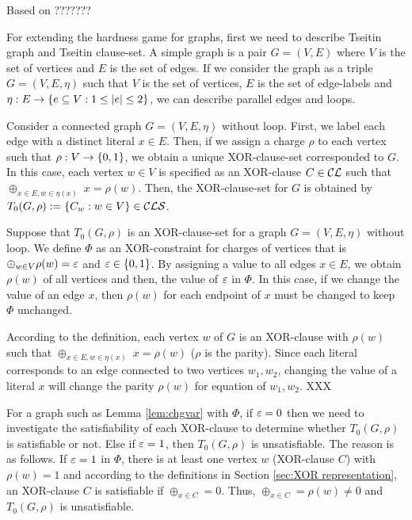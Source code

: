\documentclass{report}
\begin{document}
Based on \cite{h34,h8} ???????

For extending the hardness game for graphs, first we need to describe Tseitin graph and Tseitin clause-set. A simple graph is a pair $G = (V,E)$ where $V$ is the set of vertices and $E$ is the set of edges. If we consider the graph as a triple $G = (V,E,\eta)$ such that $V$ is the set of vertices, $E$ is the set of edge-labels and $\eta: E \rightarrow \{ e \subseteq V : 1 \le \lvert e \rvert \le 2 \}$, we can describe parallel edges and loops. 

Consider a connected graph $G=(V,E,\eta)$ without loop. First, we label each edge with a distinct literal $x \in E$. Then, if we assign a charge $\rho$ to each vertex such that $\rho: V \rightarrow \{ 0,1 \}$, we obtain a unique XOR-clause-set corresponded to $G$. In this case, each vertex $w \in V$ is specified as an XOR-clause $C \in \mathcal{CL}$ such that $\oplus_{x \in E, w \in \eta(x)} \; x = \rho(w)$. Then, the XOR-clause-set for $G$ is obtained by $T_0(G,\rho) := \{ C_w : w \in V \} \in \mathcal{CLS}$. 

\begin{lem}\label{lem:chgvar}
Suppose that $T_0(G,\rho)$ is an XOR-clause-set for a graph $G=(V,E,\eta)$ without loop. We define $\Phi$ as an XOR-constraint for charges of vertices that is $\oplus_{w \in V} \rho(w) = \varepsilon$ and $\varepsilon \in \{ 0,1 \}$. By assigning a value to all edges $x \in E$, we obtain $\rho(w)$ of all vertices and then, the value of $\varepsilon$ in $\Phi$. In this case, if we change the value of an edge $x$, then $\rho(w)$ for each endpoint of $x$ must be changed to keep $\Phi$ unchanged.
\end{lem}
\begin{prf}
According to the definition, each vertex $w$ of $G$ is an XOR-clause with $\rho(w)$ such that  $\oplus_{x \in E, w \in \eta(x)} \; x = \rho(w)$ ($\rho$ is the parity). Since each literal corresponds to an edge connected to two vertices $w_1, w_2$, changing the value of a literal $x$ will change the parity $\rho(w)$ for equation of $w_1, w_2$. XXX
\end{prf}

For a graph such as Lemma \ref{lem:chgvar} with $\Phi$, if $\varepsilon=0$ then we need to investigate the satisfiability of each XOR-clause to determine whether $T_0(G,\rho)$ is satisfiable or not. Else if $\varepsilon=1$, then $T_0(G,\rho)$ is unsatisfiable. The reason is as follows. If $\varepsilon=1$ in $\Phi$, there is at least one vertex $w$ (XOR-clause $C$) with $ \rho(w) =1$ and according to the definitions in Section \ref{sec:XOR representation}, an XOR-clause $C$ is satisfiable if $\oplus_{x \in C} = 0$. Thus, $\oplus_{x \in C} = \rho(w) \not =0$ and $T_0(G,\rho)$ is unsatisfiable.
\end{document}
